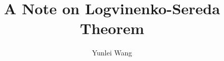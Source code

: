 \documentclass[12pt,reqno]{amsart}
\theoremstyle{definition}
\numberwithin{equation}{section}
\begin{document}
\title[A Note on Logvinenko-Sereda Theorem]{A Note on Logvinenko-Sereda Theorem}
\author[Y. Wang]{Yunlei Wang}


\maketitle


\end{document}
